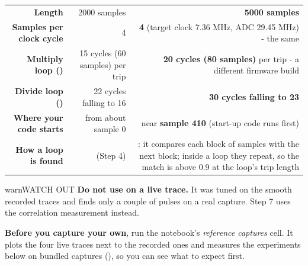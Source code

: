 \documentclass[11pt,letterpaper]{article}
\begin{document}
{\small{}
\begin{longtable}{|R{0.2899}|R{0.3043}|R{0.4058}|}
\hline
{}\hdrcell{} &  &  \\ \hline
\endhead
\textbf{Length} & 2000 samples & \textbf{5000 samples} \\ \hline
\textbf{Samples per clock cycle} & 4 & \textbf{4} (target clock 7.36 MHz, ADC 29.45 MHz) - the same \\ \hline
\textbf{Multiply loop ()} & 15 cycles (60 samples) per trip & \textbf{20 cycles (80 samples)} per trip - a different firmware build \\ \hline
\textbf{Divide loop ()} & 22 cycles falling to 16 & \textbf{30 cycles falling to 23} \\ \hline
\textbf{Where your code starts} & from about sample 0 & near \textbf{sample 410} (start-up code runs first) \\ \hline
\textbf{How a loop is found} &  (Step 4) & \textbf{}: it compares each block of  samples with the next block; inside a loop they repeat, so the match is above 0.9 at the loop's trip length \\ \hline
\end{longtable}}

\vspace{4pt}

\begin{guidecallout}{warn}{WATCH OUT}
\textbf{Do not use  on a live trace.} It was tuned on the smooth recorded traces and finds only a
couple of pulses on a real capture. Step 7 uses the correlation measurement instead.
\end{guidecallout}

\textbf{Before you capture your own}, run the notebook's \emph{reference captures} cell. It plots the four live traces
next to the recorded ones and measures the experiments below on bundled captures
(), so you can see what to expect first.
\end{document}
